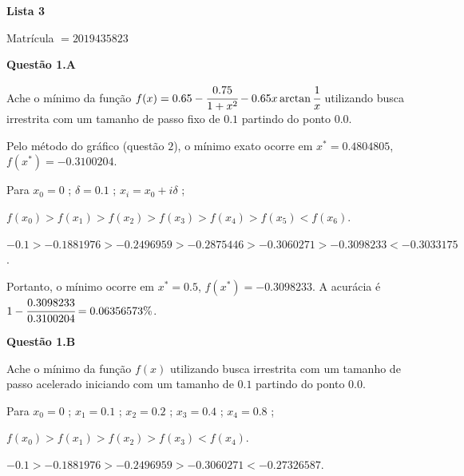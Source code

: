 \documentclass{rbfin}
\begin{document}
\rbfe{}

\begin{center}
\Large

\textbf{Lista 3}

\normalsize

Matrícula $= 2019435823$
\end{center}

\large

\textbf{Questão 1.A}

\normalsize

\vspace{6mm}

\doublespacing

Ache o mínimo da função $f(x) = 0.65 - \cfrac{0.75}{1 + x^2} - 0.65 x \arctan \cfrac{1}{x}$ utilizando busca irrestrita com um tamanho de passo fixo de $0.1$ partindo do ponto $0.0$.

Pelo método do gráfico (questão $2$), o mínimo exato ocorre em $x^* = 0.4804805$, $f(x^*) = -0.3100204$.

Para $x_0 = 0$ ; $\delta = 0.1$ ; $x_i = x_0 + i\delta$ ;

$f(x_0) > f(x_1) > f(x_2) > f(x_3) > f(x_4) > f(x_5) < f(x_6)$.

$-0.1 > -0.1881976 > -0.2496959 > -0.2875446 > -0.3060271 > -0.3098233 < -0.3033175$.

Portanto, o mínimo ocorre em $x^* = 0.5$, $f(x^*) = -0.3098233$. A acurácia é $1 - \cfrac{0.3098233}{0.3100204} = 0.06356573\%$.

\singlespacing

\vspace{6mm}

\large

\textbf{Questão 1.B}

\normalsize

\vspace{6mm}

\doublespacing

Ache o mínimo da função $f(x)$ utilizando busca irrestrita com um tamanho de passo acelerado iniciando com um tamanho de $0.1$ partindo do ponto $0.0$.

Para $x_0 = 0$ ; $x_1 = 0.1$ ; $x_2 = 0.2$ ; $x_3 = 0.4$ ; $x_4 = 0.8$ ;

$f(x_0) > f(x_1) > f(x_2) > f(x_3) < f(x_4)$.

$-0.1 > -0.1881976 > -0.2496959 > -0.3060271 < -0.27326587$.
\end{document}
